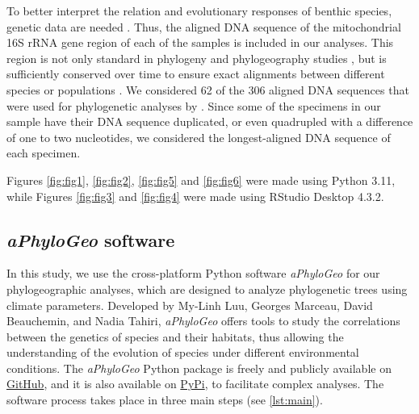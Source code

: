 To better interpret the relation and evolutionary responses of benthic species, genetic data are needed \citep{wilson_speciation_1987, uhlir_adding_2021}. Thus, the aligned DNA sequence of the mitochondrial 16S rRNA gene region of each of the samples is included in our analyses. This region is not only standard in phylogeny and phylogeography studies \citep{hugenholtz1998impact}, but is sufficiently conserved over time to ensure exact alignments between different species or populations \citep{saccone1999evolutionary}. We considered 62 of the 306 aligned DNA sequences that were used for phylogenetic analyses by \citep{uhlir_adding_2021}. Since some of the specimens in our sample have their DNA sequence duplicated, or even quadrupled with a difference of one to two nucleotides, we considered the longest-aligned DNA sequence of each specimen. 

Figures \ref{fig:fig1}, \ref{fig:fig2}, \ref{fig:fig5} and \ref{fig:fig6} were made using Python 3.11, while Figures \ref{fig:fig3} and \ref{fig:fig4} were made using RStudio Desktop 4.3.2.

\subsection{\textit{aPhyloGeo} software}

In this study, we use the cross-platform Python software \textit{aPhyloGeo} for our phylogeographic analyses, which are designed to analyze phylogenetic trees using climate parameters. Developed by My-Linh Luu, Georges Marceau, David Beauchemin, and Nadia Tahiri, \textit{aPhyloGeo} offers tools to study the correlations between the genetics of species and their habitats, thus allowing the understanding of the evolution of species under different environmental conditions. The \textit{aPhyloGeo} Python package is freely and publicly available on \href{https://github.com/tahiri-lab/aPhyloGeo}{GitHub}, and it is also available on \href{https://pypi.org/project/aphylogeo/}{PyPi}, to facilitate complex analyses. The software process takes place in three main steps (see \autoref{lst:main}).

